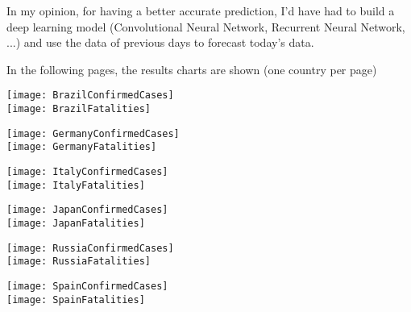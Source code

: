 \documentclass[11pt]{article}
\begin{document}
\bigskip
In my opinion, for having a better accurate prediction, I'd have had to build a deep learning model (Convolutional Neural Network, Recurrent Neural Network, ...) and use the data of previous days to forecast today's data.

\bigskip
In the following pages, the results charts are shown (one country per page)

\begin{minipage}{\textwidth}
  \centering
  \texttt{[image: BrazilConfirmedCases]} \\
  \texttt{[image: BrazilFatalities]}
\end{minipage}

\begin{minipage}{\textwidth}
  \centering
  \texttt{[image: GermanyConfirmedCases]} \\
  \texttt{[image: GermanyFatalities]}
\end{minipage}

\begin{minipage}{\textwidth}
  \centering
  \texttt{[image: ItalyConfirmedCases]} \\
  \texttt{[image: ItalyFatalities]}
\end{minipage}

\begin{minipage}{\textwidth}
  \centering
  \texttt{[image: JapanConfirmedCases]} \\
  \texttt{[image: JapanFatalities]}
\end{minipage}

\begin{minipage}{\textwidth}
  \centering
  \texttt{[image: RussiaConfirmedCases]} \\
  \texttt{[image: RussiaFatalities]}
\end{minipage}

\begin{minipage}{\textwidth}
  \centering
  \texttt{[image: SpainConfirmedCases]} \\
  \texttt{[image: SpainFatalities]}
\end{minipage}
\end{document}

